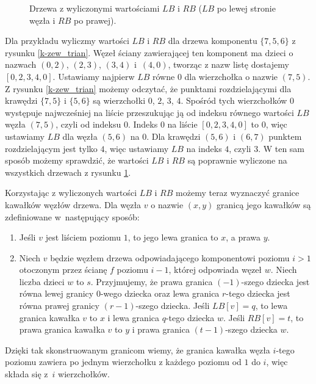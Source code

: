 \documentclass[twoside,a4paper,12pt]{report} %
\theoremstyle{break}
\begin{document}
\begin{figure}[ht]
    \centering
    
    \caption{Drzewa z wyliczonymi wartościami $LB$ i $RB$ ($LB$ po lewej stronie węzła i $RB$ po prawej).}
    \label{drzewa_boundary}
\end{figure}

Dla przykładu wyliczmy wartości $LB$ i $RB$ dla drzewa komponentu $\{7,5,6\}$ z rysunku \ref{k-zew_trian}. Węzeł ściany zawierającej ten komponent ma dzieci o nazwach $(0,2)$, $(2,3)$, $(3,4)$ i~$(4,0)$, tworząc z nazw listę dostajemy $[0,2,3,4,0]$. Ustawiamy najpierw $LB$ równe $0$ dla wierzchołka o nazwie $(7,5)$. Z rysunku \ref{k-zew_trian} możemy odczytać, że punktami rozdzielającymi dla krawędzi $\{7,5\}$ i $\{5,6\}$ są wierzchołki $0$, $2$, $3$, $4$. Spośród tych wierzchołków $0$ występuje najwcześniej na liście przeszukując ją od indeksu równego wartości $LB$ węzła $(7,5)$, czyli od indeksu $0$. Indeks $0$ na liście $[0, 2, 3, 4, 0]$ to $0$, więc ustawiamy $LB$ dla węzła $(5,6)$ na $0$. Dla krawędzi $(5,6)$ i $(6,7)$ punktem rozdzielającym jest tylko $4$, więc ustawiamy $LB$ na indeks $4$, czyli $3$. W ten sam sposób możemy sprawdzić, że wartości $LB$ i $RB$ są poprawnie wyliczone na wszystkich drzewach z rysunku \ref{drzewa_boundary}.

Korzystając z wyliczonych wartości $LB$ i $RB$ możemy teraz wyznaczyć granice kawałków węzłów drzewa. Dla węzła $v$ o nazwie $(x, y)$ granicą jego kawałków są zdefiniowane w~następujący sposób:
\begin{enumerate}
    \item Jeśli $v$ jest liściem poziomu $1$, to jego lewa granica to $x$, a prawa $y$.
    \item Niech $v$ będzie węzłem drzewa odpowiadającego komponentowi poziomu $i > 1$ otoczonym przez ścianę $f$ poziomu $i-1$, której odpowiada węzeł $w$. Niech liczba dzieci $w$ to $s$. Przyjmujemy, że prawa granica $(-1)$-szego dziecka jest równa lewej granicy $0$-wego dziecka oraz lewa granica $r$-tego dziecka jest równa prawej granicy $(r-1)$-szego dziecka. Jeśli $LB[v]=q$, to lewa granica kawałka $v$ to $x$ i lewa granica $q$-tego dziecka $w$. Jeśli $RB[v]=t$, to prawa granica kawałka $v$ to $y$ i prawa granica $(t-1)$-szego dziecka $w$.  
\end{enumerate}\par
Dzięki tak skonstruowanym granicom wiemy, że granica kawałka węzła $i$-tego poziomu zawiera po jednym wierzchołku z każdego poziomu od $1$ do $i$, więc składa się z~$i$ wierzchołków.
\end{document}
